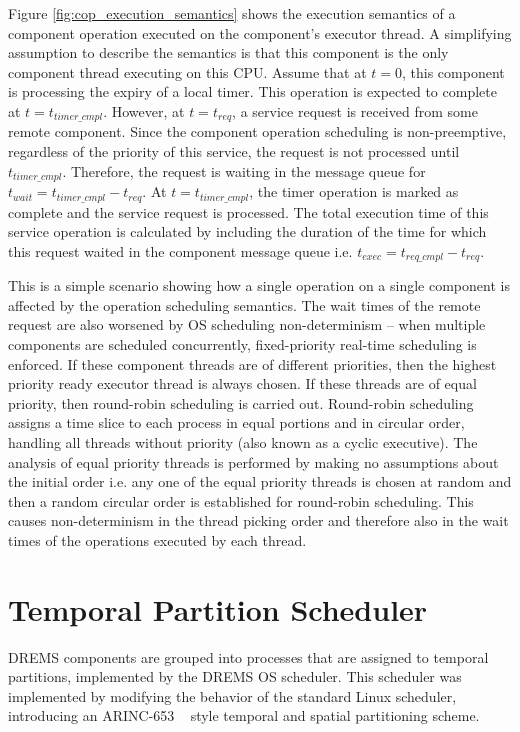 Figure \ref{fig:cop_execution_semantics} shows the execution semantics of a component operation executed on the component's executor thread. A simplifying assumption  to describe the semantics is that this component is the only component thread executing on this CPU. Assume that at $t=0$, this component is processing the expiry of a local timer. This operation is expected to complete at $t = t_{timer\_cmpl}$. However, at $t = t_{req}$, a service request is received from some remote component. Since the component operation scheduling is non-preemptive, regardless of the priority of this service, the request is not processed until $t_{timer\_cmpl}$. Therefore, the request is waiting in the message queue for $t_{wait} = t_{timer\_cmpl} - t_{req}$. At $t = t_{timer\_cmpl}$, the timer operation is marked as complete and the service request is processed. The total execution time of this service operation is calculated by including the duration of the time for which this request waited in the component message queue i.e. $t_{exec} = t_{req\_cmpl} - t_{req}$. 

This is a simple scenario showing how a single operation on a single component is affected by the operation scheduling semantics. The wait times of the remote request are also worsened by OS scheduling non-determinism -- when multiple components are scheduled concurrently, fixed-priority real-time scheduling is enforced. If these component threads are of different priorities, then the highest priority ready executor thread is always chosen. If these threads are of equal priority, then round-robin scheduling is carried out. Round-robin scheduling assigns a time slice to each process in equal portions and in circular order, handling all threads without priority (also known as a cyclic executive). The analysis of equal priority threads is performed by making no assumptions about the initial order i.e. any one of the equal priority threads is chosen at random and then a random circular order is established for round-robin scheduling. This causes non-determinism in the thread picking order and therefore also in the wait times of the operations executed by each thread. 

\section{Temporal Partition Scheduler}

DREMS components are grouped into processes that are assigned to temporal partitions, implemented by the DREMS OS scheduler. This scheduler was implemented by modifying the behavior of the standard Linux scheduler, introducing an ARINC-653 ~\cite{ARINC-653} style temporal and spatial partitioning scheme. 

